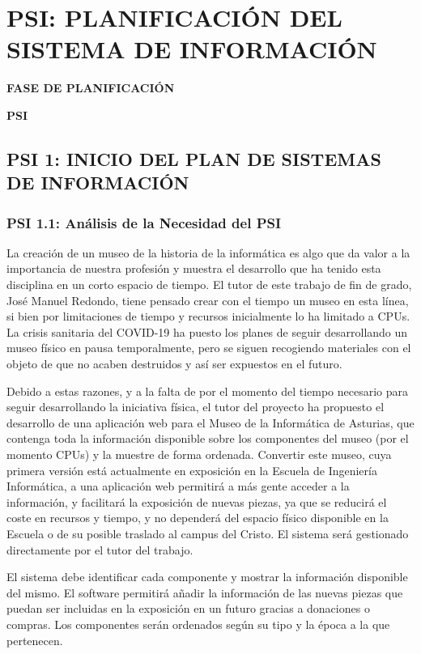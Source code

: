 \pagestyle{fancy}
\chapter{PSI: PLANIFICACIÓN DEL SISTEMA DE INFORMACIÓN}

	\vspace{2cm}	
	\begin{center}
	{\Large \textbf{FASE DE PLANIFICACIÓN} \par}
	\end{center}
	\vspace{5cm}
	
	\begin{center}
	\Huge \textbf{PSI}\par
	\end{center}

\newpage

\section{PSI 1: INICIO DEL PLAN DE SISTEMAS DE INFORMACIÓN}

\subsection{PSI 1.1: Análisis de la Necesidad del PSI} 
La creación de un museo de la historia de la informática es algo que da valor a la importancia de nuestra profesión y muestra el desarrollo que ha tenido esta disciplina en un corto espacio de tiempo. El tutor de este trabajo de fin de grado, José Manuel Redondo, tiene pensado crear con el tiempo un museo en esta línea, si bien por limitaciones de tiempo y recursos inicialmente lo ha limitado a CPUs. La crisis sanitaria del COVID-19 ha puesto los planes de seguir desarrollando un museo físico en pausa temporalmente, pero se siguen recogiendo materiales con el objeto de que no acaben destruidos y así ser expuestos en el futuro.\par
Debido a estas razones, y a la falta de por el momento del tiempo necesario para seguir desarrollando la iniciativa física, el tutor del proyecto ha propuesto el desarrollo de una aplicación web para el Museo de la Informática de Asturias, que contenga toda la información disponible sobre los componentes del museo (por el momento CPUs) y la muestre de forma ordenada. Convertir este museo, cuya primera versión está actualmente en exposición en la Escuela de Ingeniería Informática, a una aplicación web permitirá a más gente acceder a la información, y facilitará la exposición de nuevas piezas, ya que se reducirá el coste en recursos y tiempo, y no dependerá del espacio físico disponible en la Escuela o de su posible traslado al campus del Cristo. El sistema será gestionado directamente por el tutor del trabajo.
\par El sistema debe identificar cada componente y mostrar la información disponible del mismo. El software permitirá añadir la información de las nuevas piezas que puedan ser incluidas en la exposición en un futuro gracias a donaciones o compras. Los componentes serán ordenados según su tipo y la época a la que pertenecen. 

